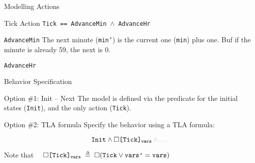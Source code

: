 \begin{frame}{Modelling Actions}
    \begin{block}{Tick Action}
        \texttt{Tick == AdvanceMin $\land$ AdvanceHr}
    \end{block}
    \pause
    \begin{block}{\texttt{AdvanceMin}}
        The next minute (\texttt{min'}) is the current one (\texttt{min}) plus one. Buf if the minute is already 59, the next is 0.
        \demo
    \end{block}
    \pause
    \begin{block}{\texttt{AdvanceHr}}
    \end{block}
\end{frame}

\begin{frame}{Behavior Specification}
    \begin{block}{Option \#1: Init -- Next}
        The model is defined via the predicate for the initial states (\texttt{Init}), and the only action (\texttt{Tick}).
        \demo
    \end{block}
    \pause
    \begin{block}{Option \#2: TLA formula}
        Specify the behavior using a TLA formula:

        \[
            \texttt{Init} \land \square \texttt{[Tick]}_{\texttt{vars}} \textcolor{gray!60}{\,\land \ldots}
        \]
        \demo

        Note that $\quad\square \texttt{[Tick]}_{\texttt{vars}} \;\mathrel{\smash {{\stackrel{\scriptscriptstyle\Delta}{=}}}}\; \square ( \texttt{Tick} \lor \texttt{vars'} = \texttt{vars} )$
    \end{block}
\end{frame}


